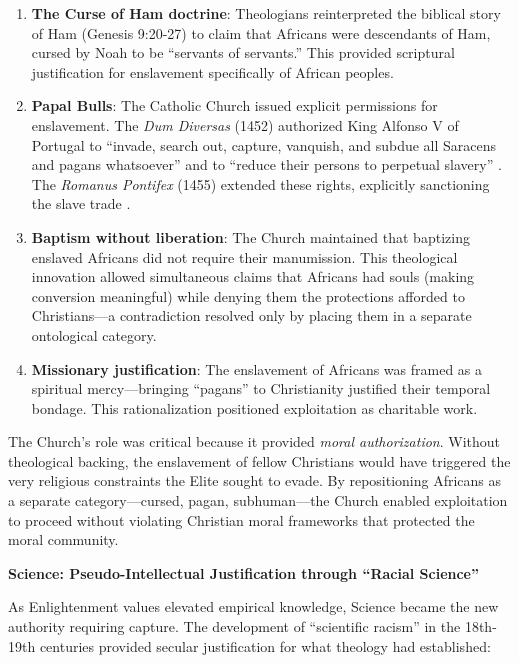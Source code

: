 \documentclass[12pt,openany]{book}
\begin{document}
\begin{enumerate}
    \item \textbf{The Curse of Ham doctrine}: Theologians reinterpreted the biblical story of Ham (Genesis 9:20-27) to claim that Africans were descendants of Ham, cursed by Noah to be ``servants of servants.'' This provided scriptural justification for enslavement specifically of African peoples.
    
    \item \textbf{Papal Bulls}: The Catholic Church issued explicit permissions for enslavement. The \textit{Dum Diversas} (1452) authorized King Alfonso V of Portugal to ``invade, search out, capture, vanquish, and subdue all Saracens and pagans whatsoever'' and to ``reduce their persons to perpetual slavery'' \cite{dumdiversas}. The \textit{Romanus Pontifex} (1455) extended these rights, explicitly sanctioning the slave trade \cite{romanuspontifex}.
    
    \item \textbf{Baptism without liberation}: The Church maintained that baptizing enslaved Africans did not require their manumission. This theological innovation allowed simultaneous claims that Africans had souls (making conversion meaningful) while denying them the protections afforded to Christians---a contradiction resolved only by placing them in a separate onto\-logical category.
    
    \item \textbf{Missionary justification}: The enslavement of Africans was framed as a spiritual mercy---bringing ``pagans'' to Christianity justified their temporal bondage. This rationalization positioned exploitation as charitable work.
\end{enumerate}

The Church's role was critical because it provided \textit{moral authorization}. Without theological backing, the enslavement of fellow Christians would have triggered the very religious constraints the Elite sought to evade. By repositioning Africans as a separate category---cursed, pagan, subhuman---the Church enabled exploitation to proceed without violating Christian moral frameworks that protected the moral community.

\textbf{Science: Pseudo-Intellectual Justification through ``Racial Science''}

As Enlightenment values elevated empirical knowledge, Science became the new authority requiring capture. The development of ``scientific racism'' in the 18th-19th centuries provided secular justification for what theology had established:
\end{document}
